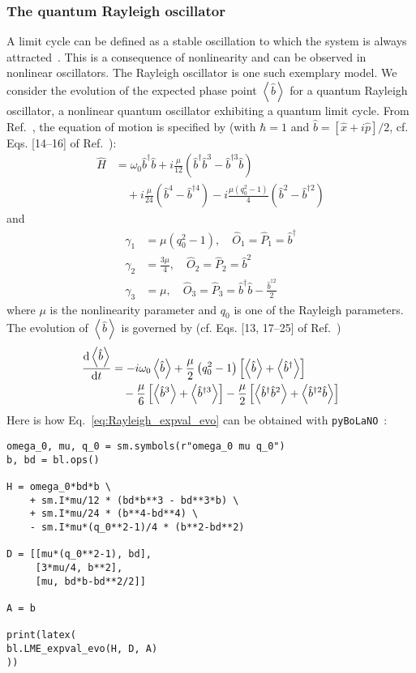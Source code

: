 \documentclass[5p, twocolumn, 10pt, sort&compress]{elsarticle}
\newcommand{\expval}[1]{\left\langle{#1}\right\rangle}
\newcommand{\bop}{\hat{b}}
\newcommand{\bdag}{\bop^\dagger}
\newcommand{\bdagn}[1]{\bop^{\dagger {#1}}}
\newcommand{\pybolano}{\texttt{pyBoLaNO}~}
\begin{document}
\subsubsection{The quantum Rayleigh oscillator}

A limit cycle can be defined as a stable oscillation to which the system is always attracted~\cite{pikovsky_synchronization_2001}. This is a consequence of nonlinearity and can be observed in nonlinear oscillators. The Rayleigh oscillator is one such exemplary model. We consider the evolution of the expected phase point $\expval{\bop}$ for a quantum Rayleigh oscillator, a nonlinear quantum oscillator exhibiting a quantum limit cycle. From Ref.~\cite{chia_relaxation_2020}, the equation of motion is specified by (with $\hbar=1$ and $\bop=\left[\hat{x}+i\hat{p}\right]/2$, cf. Eqs. [14--16] of Ref.~\cite{chia_relaxation_2020}):
\begin{equation}
\begin{split}
    \hat{H} &= \omega_0\bdag\bop + i\frac{\mu}{12}\left(\bdag\bop^3-\bdagn{3}\bop\right) 
    \\
    &\quad + i\frac{\mu}{24}\left(\bop^4-\bdagn{4}\right) - i\frac{\mu\left(q_0^2-1\right)}{4}\left(\bop^2-\bdagn{2}\right)
\end{split}
\end{equation}
and
\begin{subequations}
\begin{align}
    \gamma_1 &= \mu\left(q_0^2-1\right),\quad \hat{O}_1=\hat{P}_1 = \bdag 
    \\
    \gamma_2 &= \frac{3\mu}{4}, \quad \hat{O}_2 = \hat{P}_2=\bop^2
    \\
    \gamma_3 &= \mu, \quad \hat{O}_3=\hat{P}_3 = \bdag\bop - \frac{\bdagn{2}}{2}
\end{align}
\end{subequations}
where $\mu$ is the nonlinearity parameter and $q_0$ is one of the Rayleigh parameters. The evolution of $\expval{\bop}$ is governed by (cf. Eqs. [13, 17--25] of Ref.~\cite{chia_relaxation_2020})
\begin{equation}\label{eq:Rayleigh_expval_evo}
\begin{split}
    \odv{\expval{\bop}}{t} &= -i\omega_0\expval{\bop} + \frac{\mu}{2} \left(q_0^2-1\right) \left[\expval{\bop}+\expval{\bdag}\right] 
    \\
    &\quad -\frac{\mu}{6}\left[\expval{\bop^3}+\expval{\bdagn{3}}\right] - \frac{\mu}{2}\left[\expval{\bdag\bop^2}+\expval{\bdagn{2}\bop}\right]
\end{split}
\end{equation}
Here is how Eq.~\eqref{eq:Rayleigh_expval_evo} can be obtained with \pybolano:
\begin{verbatim}
omega_0, mu, q_0 = sm.symbols(r"omega_0 mu q_0")
b, bd = bl.ops()

H = omega_0*bd*b \
    + sm.I*mu/12 * (bd*b**3 - bd**3*b) \
    + sm.I*mu/24 * (b**4-bd**4) \
    - sm.I*mu*(q_0**2-1)/4 * (b**2-bd**2)

D = [[mu*(q_0**2-1), bd],
     [3*mu/4, b**2],
     [mu, bd*b-bd**2/2]]

A = b

print(latex(
bl.LME_expval_evo(H, D, A)
))
\end{verbatim}
\end{document}

